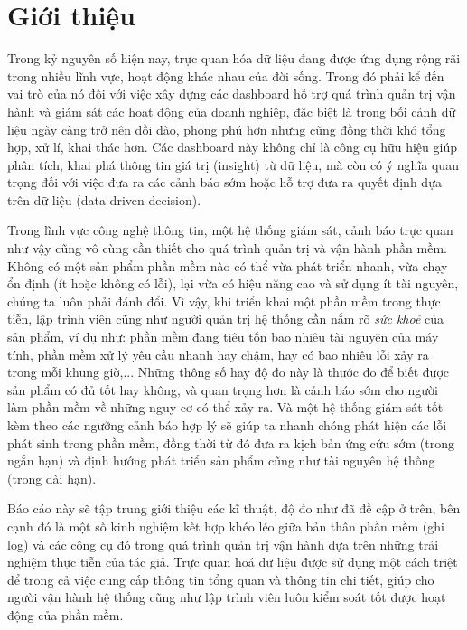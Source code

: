 \chapter{Giới thiệu}
Trong kỷ nguyên số hiện nay, trực quan hóa dữ liệu đang được ứng dụng rộng rãi trong nhiều lĩnh vực, hoạt động khác nhau của đời sống. Trong đó phải kể đến vai trò của nó đối với việc xây dựng các dashboard hỗ trợ quá trình quản trị vận hành và giám sát các hoạt động của doanh nghiệp, đặc biệt là trong bối cảnh dữ liệu ngày càng trở nên dồi dào, phong phú hơn nhưng cũng đồng thời khó tổng hợp, xử lí, khai thác hơn. Các dashboard này không chỉ là công cụ hữu hiệu giúp phân tích, khai phá thông tin giá trị (insight) từ dữ liệu, mà còn có ý nghĩa quan trọng đối với việc đưa ra các cảnh báo sớm hoặc hỗ trợ đưa ra quyết định dựa trên dữ liệu (data driven decision). 

Trong lĩnh vực công nghệ thông tin, một hệ thống giám sát, cảnh báo trực quan như vậy cũng vô cùng cần thiết cho quá trình quản trị và vận hành phần mềm. Không có một sản phẩm phần mềm nào có thể vừa phát triển nhanh, vừa chạy ổn định (ít hoặc không có lỗi), lại vừa có hiệu năng cao và sử dụng ít tài nguyên, chúng ta luôn phải đánh đổi. Vì vậy, khi triển khai một phần mềm trong thực tiễn, lập trình viên cũng như người quản trị hệ thống cần nắm rõ \textit{sức khoẻ} của sản phẩm, ví dụ như: phần mềm đang tiêu tốn bao nhiêu tài nguyên của máy tính, phần mềm xử lý yêu cầu nhanh hay chậm, hay có bao nhiêu lỗi xảy ra trong mỗi khung giờ,... Những thông số hay độ đo này là thước đo để biết được sản phẩm có đủ tốt hay không, và quan trọng hơn là cảnh báo sớm cho người làm phần mềm về những nguy cơ có thể xảy ra. Và một hệ thống giám sát tốt kèm theo các ngưỡng cảnh báo hợp lý sẽ giúp ta nhanh chóng phát hiện các lỗi phát sinh trong phần mềm, đồng thời từ đó đưa ra kịch bản ứng cứu sớm (trong ngắn hạn) và định hướng phát triển sản phẩm cũng như tài nguyên hệ thống (trong dài hạn).

Báo cáo này sẽ tập trung giới thiệu các kĩ thuật, độ đo như đã đề cập ở trên, bên cạnh đó là một số kinh nghiệm kết hợp khéo léo giữa bản thân phần mềm (ghi log) và các công cụ đó trong quá trình quản trị vận hành dựa trên những trải nghiệm thực tiễn của tác giả. Trực quan hoá dữ liệu được sử dụng một cách triệt để trong cả việc cung cấp thông tin tổng quan và thông tin chi tiết, giúp cho người vận hành hệ thống cũng như lập trình viên luôn kiểm soát tốt được hoạt động của phần mềm.
